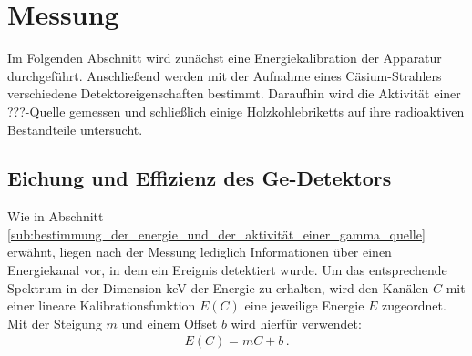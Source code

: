 \section{Messung}
\label{sec:messung}
Im Folgenden Abschnitt wird zunächst eine Energiekalibration der Apparatur durchgeführt. Anschließend werden mit der Aufnahme eines Cäsium-Strahlers verschiedene Detektoreigenschaften bestimmt.
Daraufhin wird die Aktivität einer ???-Quelle gemessen und schließlich einige Holzkohlebriketts auf ihre radioaktiven Bestandteile untersucht.

\subsection{Eichung und Effizienz des Ge-Detektors}
\label{subse:eichung}
Wie in Abschnitt \ref{sub:bestimmung_der_energie_und_der_aktivität_einer_gamma_quelle} erwähnt, liegen nach der Messung lediglich Informationen über einen Energiekanal vor, in dem ein Ereignis detektiert wurde.
Um das entsprechende Spektrum in der Dimension \si{keV} der Energie zu erhalten, wird den Kanälen $C$ mit einer lineare Kalibrationsfunktion $E(C)$ eine jeweilige Energie $E$ zugeordnet.
Mit der Steigung $m$ und einem Offset $b$ wird hierfür verwendet:%
%
\begin{align}
    \label{eqn:kalibration}
    E(C) = mC + b\,.
\end{align}

